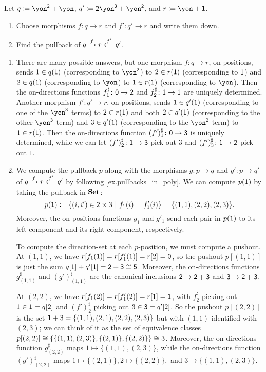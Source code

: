 \documentclass[Book-Poly]{subfiles}
\begin{document}
\begin{exercise}
Let $q\coloneqq \yon^\2+\yon$, $q'\coloneqq\2\yon^\3+\yon^\2$, and $r\coloneq\yon+\1$.
\begin{enumerate}
	\item Choose morphisms $f\colon q\to r$ and $f'\colon q'\to r$ and write them down.
	\item Find the pullback of $q\xrightarrow{f} r\xleftarrow{f'} q'$.
\qedhere
\end{enumerate}
\begin{solution}
\begin{enumerate}
    \item There are many possible answers, but one morphism $f \colon q \to r$, on positions, sends $1 \in q(\textsf{1})$ (corresponding to $\yon^\2$) to $2 \in r(\textsf{1})$ (corresponding to $\textsf{1}$) and $2 \in q(\textsf{1})$ (corresponding to $\yon$) to $1 \in r(\textsf{1})$ (corresponding to $\yon$).
    Then the on-directions functions $f^\sharp_1 \colon \textsf{0} \to \textsf{2}$ and $f^\sharp_2 \colon \textsf{1} \to \textsf{1}$ are uniquely determined.
    Another morphism $f' \colon q' \to r$, on positions, sends $1 \in q'(\textsf{1})$ (corresponding to one of the $\yon^\3$ terms) to $2 \in r(\textsf{1})$ and both $2 \in q'(\textsf{1})$ (corresponding to the other $\yon^\3$ term) and $3 \in q'(\textsf{1})$ (corresponding to the $\yon^\2$ term) to $1 \in r(\textsf{1})$.
    Then the on-directions function $(f')^\sharp_1 \colon \textsf{0} \to \textsf{3}$ is uniquely determined, while we can let $(f')^\sharp_2 \colon \textsf{1} \to \textsf{3}$ pick out $3$ and $(f')^\sharp_3 \colon \textsf{1} \to \textsf{2}$ pick out $1$.
    
    \item We compute the pullback $p$ along with the morphisms $g \colon p \to q$ and $g' \colon p \to q'$ of $q\xrightarrow{f} r\xleftarrow{f'} q'$ by following \cref{ex.pullbacks_in_poly}.
    We can compute $p(\textsf{1})$ by taking the pullback in $\mathbf{Set}$:
    \[
        p(\1) \coloneqq \{(i, i') \in \2 \times \3 \ | \ f_1(i) = f'_1(i)\} = \{(1,1), (2,2), (2,3)\}.
    \]
    Moreover, the on-positions functions $g_1$ and $g'_1$ send each pair in $p(\textsf{1})$ to its left component and its right component, respectively.
    
    To compute the direction-set at each $p$-position, we must compute a pushout.
    At $(1,1)$, we have $r[f_1(1)] = r[f'_1(1)] = r[2] = \textsf{0}$, so the pushout $p[(1,1)]$ is just the sum $q[1] + q'[1] = \textsf{2} + \textsf{3} \cong \textsf{5}$.
    Moreover, the on-directions functions $g^\sharp_{(1,1)}$ and $(g')^\sharp_{(1,1)}$ are the canonical inclusions $\textsf{2} \to \textsf{2} + \textsf{3}$ and $\textsf{3} \to \textsf{2} + \textsf{3}$.
    
    At $(2,2)$, we have $r[f_1(2)] = r[f'_1(2)] = r[1] = \textsf{1}$, with $f^\sharp_2$ picking out $1 \in \textsf{1} = q[2]$ and $(f')^\sharp_2$ picking out $3 \in \textsf{3} = q'[2]$.
    So the pushout $p[(2,2)]$ is the set $\textsf{1} + \textsf{3} = \{(1,1), (2,1), (2,2), (2,3)\}$ but with $(1,1)$ identified with $(2,3)$; we can think of it as the set of equivalence classes $p[(2,2)] \cong \{\{(1,1), (2,3)\}, \{(2,1)\}, \{(2,2)\}\} \cong \textsf{3}$.
    Moreover, the on-directions function $g^\sharp_{(2,2)}$ maps $1 \mapsto \{(1,1), (2,3)\}$, while the on-directions function $(g')^\sharp_{(2,2)}$ maps $1 \mapsto \{(2,1)\}, 2 \mapsto \{(2,2)\},$ and $3 \mapsto \{(1,1), (2,3)\}$.
    

\end{enumerate}
\end{solution}
\end{exercise}
\end{document}
